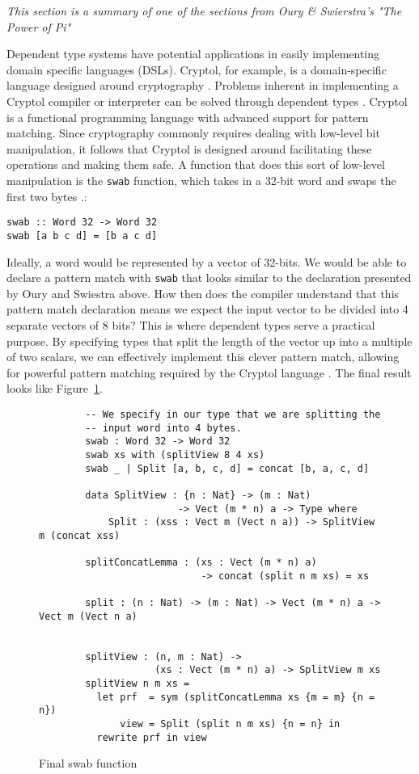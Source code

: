 \textit{This section is a summary of one of the sections from Oury \&
Swierstra's "The Power of Pi" \cite{power_of_pi}}

Dependent type systems have potential applications in easily implementing domain
specific languages (DSLs). Cryptol, for example, is a domain-specific language
designed around cryptography \cite{cryptol_manual}. Problems inherent in
implementing a Cryptol compiler or interpreter can be solved through dependent
types \cite{power_of_pi}. Cryptol is a functional programming language with
advanced support for pattern matching. Since cryptography commonly requires
dealing with low-level bit manipulation, it follows that Cryptol is designed
around facilitating these operations and making them safe. A function that does
this sort of low-level manipulation is the \texttt{swab} function, which takes
in a 32-bit word and swaps the first two bytes \cite{cryptol_manual}.: 

\texttt{swab :: Word 32 -> Word 32}\\
\texttt{swab [a b c d] = [b a c d]}

Ideally, a word would be represented by a vector of 32-bits. We would be able to
declare a pattern match with \texttt{swab} that looks similar to the declaration
presented by Oury and Swiestra above. How then does the compiler understand that
this pattern match declaration means we expect the input vector to be divided
into 4 separate vectors of 8 bits? This is where dependent types serve a
practical purpose. By specifying types that split the length of the vector up
into a multiple of two scalars, we can effectively implement this clever pattern
match, allowing for powerful pattern matching required by the Cryptol language
\cite{power_of_pi}. The final result looks like Figure~\ref{swab}. 

\begin{figure}[ht!]
    \caption{Final swab function \protect\cite{power_of_pi}}
    \label{swab}
    \begin{lstlisting}
        -- We specify in our type that we are splitting the
        -- input word into 4 bytes. 
        swab : Word 32 -> Word 32
        swab xs with (splitView 8 4 xs)
        swab _ | Split [a, b, c, d] = concat [b, a, c, d]

        data SplitView : {n : Nat} -> (m : Nat) 
                        -> Vect (m * n) a -> Type where
            Split : (xss : Vect m (Vect n a)) -> SplitView m (concat xss)
        
        splitConcatLemma : (xs : Vect (m * n) a) 
                            -> concat (split n m xs) = xs
        
        split : (n : Nat) -> (m : Nat) -> Vect (m * n) a -> Vect m (Vect n a)


        splitView : (n, m : Nat) -> 
                    (xs : Vect (m * n) a) -> SplitView m xs
        splitView n m xs =
          let prf  = sym (splitConcatLemma xs {m = m} {n = n})
              view = Split (split n m xs) {n = n} in
          rewrite prf in view
    \end{lstlisting}
\end{figure}

